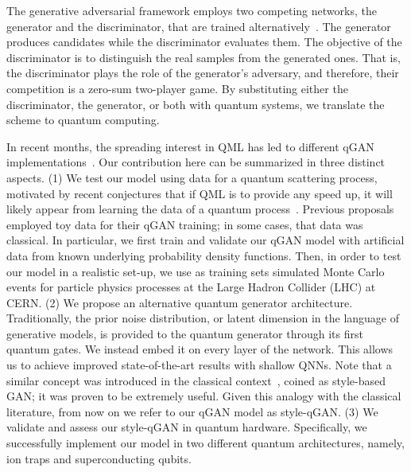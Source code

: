 \documentclass[twocolumn,preprintnumbers,superscriptaddress]{revtex4-2}
\begin{document}
The generative adversarial framework employs two competing networks, the generator and the discriminator, that are
trained alternatively~\cite{goodfellow2014generative}. The generator produces candidates
while the discriminator evaluates them. The objective of the discriminator is to
distinguish the real samples from the generated ones. That is, the discriminator
plays the role of the generator's adversary, and therefore, their competition is
a zero-sum two-player game. By substituting either the discriminator, the
generator, or both with quantum systems, we translate the scheme to quantum
computing.

In recent months, the spreading interest in QML has led to different qGAN
implementations~\cite{zoufal2019quantum, zeng2019learning, situ2020quantum, hu2019quantum, benedetti2019adversarial, romero2021variational, niu2021entangling}. Our contribution here can be summarized in three distinct aspects. (1) We test our model using data for a quantum scattering process, motivated by recent conjectures that if QML is to provide any speed up, it will likely appear from learning the data of a quantum process~\cite{huang2021information, kubler2021inductive}. Previous proposals employed toy data for their qGAN training; in some cases, that data was classical. In particular, we first train and validate our qGAN model with artificial data from known underlying probability density functions. Then, in order to test our model in a realistic set-up, we use as training sets simulated Monte Carlo events for particle physics processes at the Large Hadron Collider (LHC) at CERN. (2) We propose an alternative quantum generator architecture. Traditionally, the prior noise distribution, or latent dimension in the language of generative models, is provided to the quantum generator through its first quantum gates. We instead embed it on every layer of the network. This allows us to achieve improved state-of-the-art results with shallow QNNs. Note that a similar concept was introduced in the classical context~\cite{karras2019style}, coined as style-based GAN; it was proven to be extremely useful. Given this analogy with the classical literature, from now on we refer to our qGAN model as style-qGAN. (3) We validate and assess our style-qGAN in quantum hardware. Specifically, we successfully implement our model in two different quantum architectures, namely, ion traps and superconducting qubits.
\end{document}
